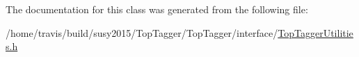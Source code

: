 The documentation for this class was generated from the following file\-:\begin{DoxyCompactItemize}
\item 
/home/travis/build/susy2015/\-Top\-Tagger/\-Top\-Tagger/interface/\hyperlink{TopTaggerUtilities_8h}{Top\-Tagger\-Utilities.\-h}\end{DoxyCompactItemize}
